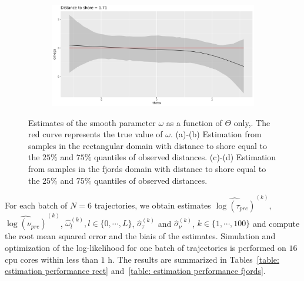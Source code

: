 \documentclass[11pt]{article}
\newcommand {\1}{\mathbb{1}}
\begin{document}
\begin{figure}[H]
\begin{subfigure}{0.48\textwidth}
		\caption{}
	\end{subfigure}
	\begin{subfigure}{0.48\textwidth}
		\centering
		\includegraphics[scale=0.3]{images/simulation study/fe_crcvm_fjords_hf_ne1_omega_theta_q2_ExpShore .png}
		\caption{}
	\end{subfigure}
	\caption{Estimates of the smooth parameter $\omega$ as a function of $\Theta$ only,. The red curve represents the true value of $\omega$. (a)-(b) Estimation from samples in the rectangular domain with distance to shore equal to the $25\%$ and $75\%$ quantiles of observed distances. (c)-(d) Estimation from samples in the fjords domain with distance to shore equal to the $25\%$ and $75\%$ quantiles of observed distances. }
	\label{fig: marginal_estimates_CRCVM}
\end{figure}


For each batch of $N=6$ trajectories, we obtain estimates $\widehat{\log(\tau_{pre})}^{(k)}$, $\widehat{\log(\nu_{pre})}^{(k)}$, $\hat{\omega}_l^{(k)}, l \in \{0,\cdots, L\}$, $\hat{\sigma}_{\tau}^{(k)}$ and $\hat{\sigma}_{\nu}^{(k)}$, $k \in \{1,\cdots,100\}$ and compute the root mean squared error and the biais of the estimates. Simulation and optimization of the log-likelihood for one batch of trajectories is performed on $16$ cpu cores within less than $1$ h. The results are summarized in Tables~\ref{table: estimation performance rect} and~\ref{table: estimation performance fjords}. 
\end{document}
